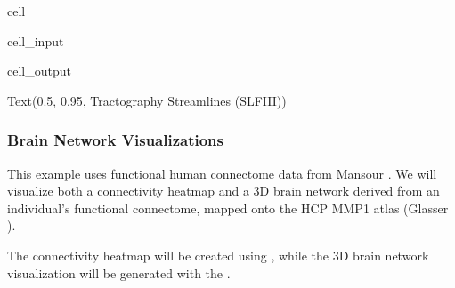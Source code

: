 \documentclass[letterpaper,10pt,english]{jupyterBook}
\begin{document}
\begin{sphinxuseclass}{cell}
\begin{sphinxVerbatimInput}
\begin{sphinxuseclass}{cell_input}
\end{sphinxuseclass}\end{sphinxVerbatimInput}
\begin{sphinxVerbatimOutput}

\begin{sphinxuseclass}{cell_output}
\begin{sphinxVerbatim}[commandchars=\\\{\}]
Text(0.5, 0.95, \PYGZsq{}Tractography Streamlines (SLF\PYGZhy{}III)\PYGZsq{})
\end{sphinxVerbatim}

\noindent{}

\end{sphinxuseclass}\end{sphinxVerbatimOutput}

\end{sphinxuseclass}

\subsubsection{Brain Network Visualizations}
\label{\detokenize{chapters/03/03c_visualization-examples:brain-network-visualizations}}
\sphinxAtStartPar
This example uses functional human connectome data from Mansour \sphinxfootnotemark[6]. We will visualize both a connectivity heatmap and a 3D brain network derived from an individual’s functional connectome, mapped onto the HCP MMP1 atlas (Glasser \sphinxfootnotemark[4]).

\sphinxAtStartPar
The connectivity heatmap will be created using , while the 3D brain network visualization will be generated with the .
\end{document}
